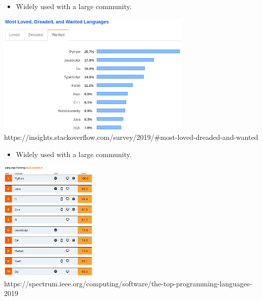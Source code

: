 \documentclass[aspectratio=1610,slidestop]{beamer}
\begin{document}
\begin{pframe}
 \begin{itemize}
  \item Widely used with a large community.
 \end{itemize}
 \vspace{-0.5cm}
 \begin{center}
  \includegraphics[width=0.70\textwidth]{../../images/stackoverflow_most_wanted_2019.png}\\
  \tiny{https://insights.stackoverflow.com/survey/2019/\#most-loved-dreaded-and-wanted}
 \end{center}
\end{pframe}

\begin{pframe}
 \begin{itemize}
  \item Widely used with a large community.
 \end{itemize}
 \vspace{-0.5cm}
 \begin{center}
  \includegraphics[width=0.35\textwidth]{../../images/ieee_programming_languages_top_2019.png}\\
  \tiny{https://spectrum.ieee.org/computing/software/the-top-programming-languages-2019}
 \end{center}
\end{pframe}
\end{document}
